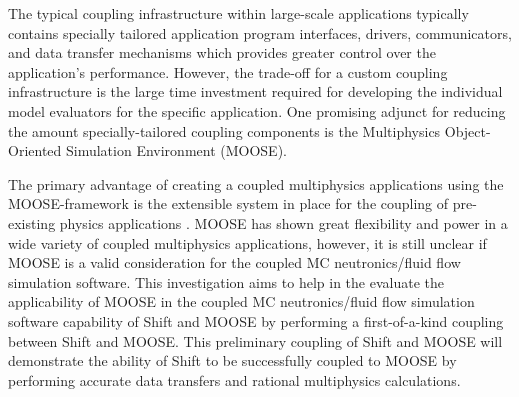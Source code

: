 \documentclass{anstrans}
\begin{document}
The typical coupling infrastructure within large-scale applications typically contains specially tailored application program interfaces, drivers, communicators, and data transfer mechanisms which provides greater control over the application's performance. However, the trade-off for a custom coupling infrastructure is the large time investment required for developing the individual model evaluators for the specific application. One promising adjunct for reducing the amount specially-tailored coupling components is the Multiphysics Object-Oriented Simulation Environment (MOOSE).

The primary advantage of creating a coupled multiphysics applications using the MOOSE-framework is the extensible system in place for the coupling of pre-existing physics applications \cite{moose}. MOOSE has shown great flexibility and power in a wide variety of coupled multiphysics applications, however, it is still unclear if MOOSE is a valid consideration for the coupled MC neutronics/fluid flow simulation software. This investigation aims to help in the evaluate the applicability of MOOSE in the coupled MC neutronics/fluid flow simulation software capability of Shift and MOOSE by performing a first-of-a-kind coupling between Shift and MOOSE. This preliminary coupling of Shift and MOOSE will demonstrate the ability of Shift to be successfully coupled to MOOSE by performing accurate data transfers and rational multiphysics calculations.  


\end{document}
